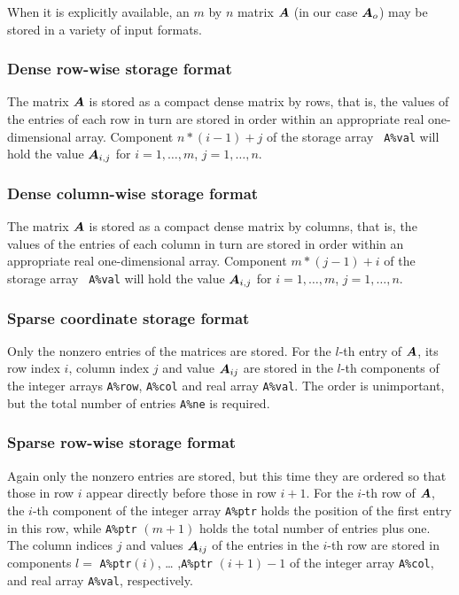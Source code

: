 \documentclass{galahad}
\begin{document}

\galmatrix
When it is explicitly available, an $m$ by $n$ matrix ${\bm{A}}$ 
(in our case ${\bm{A}}_o$) may be stored in a variety of input formats.

\subsubsection{Dense row-wise storage format}\label{dense-row}
The matrix ${\bm{A}}$ is stored as a compact dense matrix by rows,
that is, the values of the entries of each row in turn are
stored in order within an appropriate real one-dimensional array.
Component $n \ast (i-1) + j$ of the storage array {\tt
  A\%val} will hold the value ${\bm{A}}_{i,j}$ for $i = 1, \ldots , m$, $j =
1, \ldots , n$.

\subsubsection{Dense column-wise storage format}\label{dense-column}
The matrix ${\bm{A}}$ is stored as a compact
dense matrix by columns, that is, the values of the entries of each column
in turn are stored in order within an appropriate real one-dimensional array.
Component $m \ast (j-1) + i$ of the storage array {\tt
  A\%val} will hold the value ${\bm{A}}_{i,j}$ for $i = 1, \ldots , m$, $j =
1, \ldots , n$.

\subsubsection{Sparse coordinate storage format}\label{coordinate}
Only the nonzero entries of the matrices are stored. For the $l$-th
entry of ${\bm{A}}$, its row index $i$, column index $j$ and value
${\bm{A}}_{ij}$ are stored in the $l$-th components of the integer arrays
{\tt A\%row}, {\tt A\%col} and real array {\tt A\%val}.
The order is unimportant, but the total number of entries {\tt A\%ne} is
required.

\subsubsection{Sparse row-wise storage format}\label{rowwise}
Again only the nonzero entries are stored, but this time they are
ordered so that those in row $i$ appear directly before those in row
$i+1$. For the $i$-th row of ${\bm{A}}$, the $i$-th component of the integer
array {\tt A\%ptr} holds the position of the first entry in this row,
while {\tt A\%ptr} $(m+1)$ holds the total number of entries plus one.
The column indices $j$ and values ${\bm{A}}_{ij}$ of the entries in the
$i$-th row are stored in components $l =$ {\tt A\%ptr}$(i)$, \ldots
,{\tt A\%ptr} $(i+1)-1$ of the integer array {\tt A\%col}, and real
array {\tt A\%val}, respectively.
\end{document}
